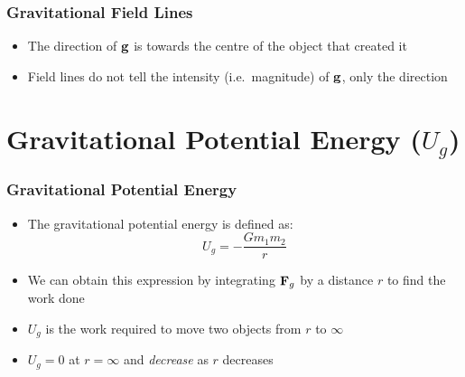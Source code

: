 \documentclass[12pt,compress,aspectratio=169]{beamer}
\newcommand{\mb}[1]{\ensuremath\mathbf{#1}}
\begin{document}
\begin{frame}
  \frametitle{Gravitational Field Lines}
  \begin{center}
  \end{center}
  \begin{itemize}
  \item The direction of $\mb{g}$ is towards the centre of the object that
    created it
  \item Field lines do not tell the intensity (i.e.\ magnitude) of $\mb{g}$,
    only the direction
  \end{itemize}
\end{frame}




\section[$U_g$]{Gravitational Potential Energy ($U_g$)}


\begin{frame}
  \frametitle{Gravitational Potential Energy}

  \begin{itemize}
  \item The gravitational potential energy is defined as:
    {\Large
      \begin{displaymath}
        \boxed{U_g=-\frac{Gm_1m_2}{r}}
    \end{displaymath}
    }
  \item We can obtain this expression by integrating $\mb{F}_g$ by a distance
    $r$ to find the work done
  \item $U_g$ is the work required to move two objects from $r$ to $\infty$
  \item $U_g=0$ at $r=\infty$ and \emph{decrease} as $r$ decreases
  \end{itemize}
\end{frame}
\end{document}
